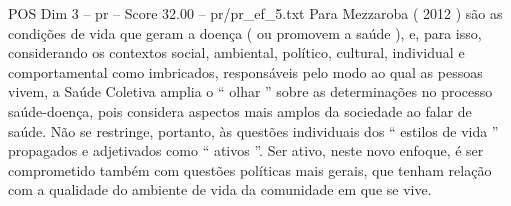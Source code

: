 \begin{textsample}{POS Dim 3 – pr – Score 32.00 – pr/pr\_ef\_5.txt}
Para Mezzaroba ( 2012 ) são as condições de vida que geram a doença ( ou promovem a saúde ), e, para isso, considerando os contextos social, ambiental, político, cultural, individual e comportamental como imbricados, responsáveis pelo modo ao qual as pessoas vivem, a Saúde Coletiva amplia o “ olhar ” sobre as determinações no processo saúde-doença, pois considera aspectos mais amplos da sociedade ao falar de saúde.
Não se restringe, portanto, às questões individuais dos “ estilos de vida ” propagados e adjetivados como “ ativos ”.
Ser ativo, neste novo enfoque, é ser comprometido também com questões políticas mais gerais, que tenham relação com a qualidade do ambiente de vida da comunidade em que se vive.

\end{textsample}
